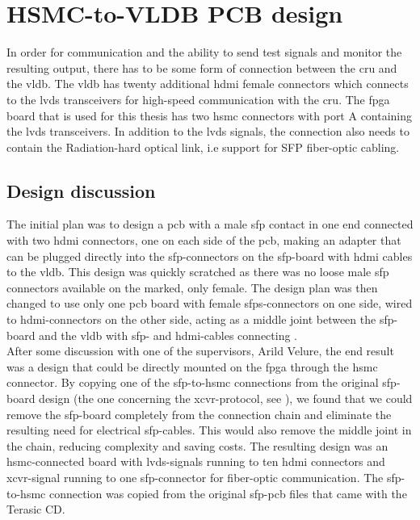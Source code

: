 \documentclass[main.tex]{subfiles}
\begin{document}
\chapter{HSMC-to-VLDB PCB design} \label{chap:pcb}

In order for communication and the ability to send test signals and monitor the resulting output, there has to be some form of connection between the \gls{cru} and the \gls{vldb}. The \gls{vldb} has twenty additional \acrshort{hdmi} female connectors which connects to the \gls{lvds} transceivers for high-speed communication with the \gls{cru}. The \gls{fpga} board that is used for this thesis has two \gls{hsmc} connectors with port A containing the \gls{lvds} transceivers. In addition to the \gls{lvds} signals, the connection also needs to contain the Radiation-hard optical link, i.e support for SFP fiber-optic cabling.\\

\section{Design discussion}

The initial plan was to design a \gls{pcb} with a male \gls{sfp} contact in one end connected with two \gls{hdmi} connectors, one on each side of the \gls{pcb}, making an adapter that can be plugged directly into the \gls{sfp}-connectors on the \gls{sfp}-board with \gls{hdmi} cables to the \gls{vldb}. This design was quickly scratched as there was no loose male \gls{sfp} connectors available on the marked, only female. The design plan was then changed to use only one \gls{pcb} board with female \glspl{sfp}-connectors on one side, wired to \gls{hdmi}-connectors on the other side, acting as a middle joint between the \gls{sfp}-board and the \gls{vldb} with \gls{sfp}- and \gls{hdmi}-cables connecting . \\

After some discussion with one of the supervisors, Arild Velure, the end result was a design that could be directly mounted on the \gls{fpga} through the \gls{hsmc} connector. By copying one of the \gls{sfp}-to-\gls{hsmc} connections from the original \gls{sfp}-board design (the one concerning the \gls{xcvr}-protocol, see \cite{sfp_schem}), we found that we could remove the \gls{sfp}-board completely from the connection chain and eliminate the resulting need for electrical \gls{sfp}-cables. This would also remove the middle joint in the chain, reducing complexity and saving costs. The resulting design was an \gls{hsmc}-connected board with \gls{lvds}-signals running to ten \gls{hdmi} connectors and \gls{xcvr}-signal running to one \gls{sfp}-connector for fiber-optic communication. The \gls{sfp}-to-\gls{hsmc} connection was copied from the original \gls{sfp}-\gls{pcb} files that came with the Terasic CD.
\end{document}
